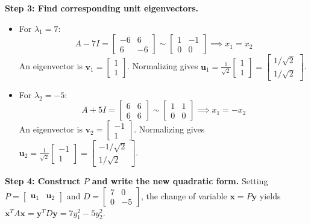 \documentclass[11pt, letterpaper]{article}
\theoremstyle{definition}
\theoremstyle{remark}
\begin{document}
\textbf{Step 3: Find corresponding unit eigenvectors.}
\begin{itemize}
    \item For $\lambda_1 = 7$:
    \[
    A - 7I = \begin{bmatrix} -6 & 6 \\ 6 & -6 \end{bmatrix} \sim \begin{bmatrix} 1 & -1 \\ 0 & 0 \end{bmatrix} \implies x_1 = x_2
    \]
    An eigenvector is $\mathbf{v}_1 = \begin{bmatrix} 1 \\ 1 \end{bmatrix}$. Normalizing gives $\mathbf{u}_1 = \frac{1}{\sqrt{2}}\begin{bmatrix} 1 \\ 1 \end{bmatrix} = \begin{bmatrix} 1/\sqrt{2} \\ 1/\sqrt{2} \end{bmatrix}$.
    \item For $\lambda_2 = -5$:
    \[
    A + 5I = \begin{bmatrix} 6 & 6 \\ 6 & 6 \end{bmatrix} \sim \begin{bmatrix} 1 & 1 \\ 0 & 0 \end{bmatrix} \implies x_1 = -x_2
    \]
    An eigenvector is $\mathbf{v}_2 = \begin{bmatrix} -1 \\ 1 \end{bmatrix}$. Normalizing gives $\mathbf{u}_2 = \frac{1}{\sqrt{2}}\begin{bmatrix} -1 \\ 1 \end{bmatrix} = \begin{bmatrix} -1/\sqrt{2} \\ 1/\sqrt{2} \end{bmatrix}$.
\end{itemize}
\textbf{Step 4: Construct $P$ and write the new quadratic form.}
Setting $P = \begin{bmatrix} \mathbf{u}_1 & \mathbf{u}_2 \end{bmatrix}$ and $D = \begin{bmatrix} 7 & 0 \\ 0 & -5 \end{bmatrix}$, the change of variable $\mathbf{x} = P\mathbf{y}$ yields $\mathbf{x}^T A \mathbf{x} = \mathbf{y}^T D \mathbf{y} = 7y_1^2 - 5y_2^2$.
\end{document}

